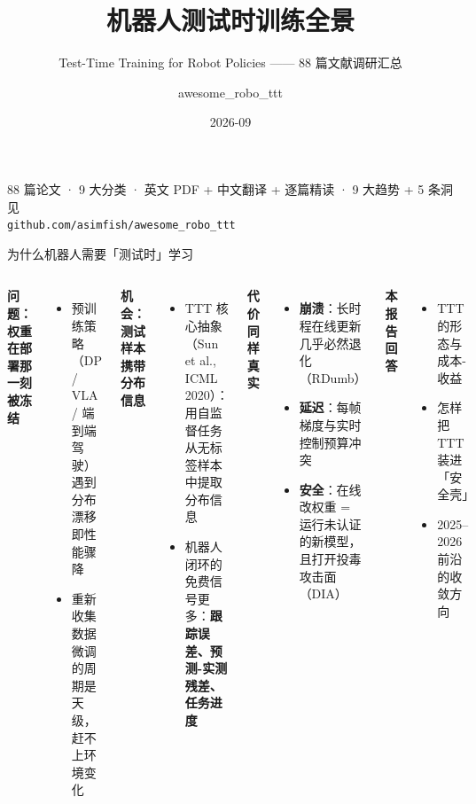\documentclass[10pt,aspectratio=169]{beamer}
\title[awesome\_robo\_ttt]{机器人测试时训练全景}
\subtitle{Test-Time Training for Robot Policies —— 88 篇文献调研汇总}
\author{awesome\_robo\_ttt}
\date{2026-09}
\newcommand{\hl}[1]{\textcolor{good}{\textbf{#1}}}
\newcommand{\ba}[1]{\textcolor{bad}{\textbf{#1}}}
\begin{document}
\begin{frame}
\titlepage
\begin{center}
\small 88 篇论文 · 9 大分类 · 英文 PDF + 中文翻译 + 逐篇精读 · 9 大趋势 + 5 条洞见\\
\texttt{github.com/asimfish/awesome\_robo\_ttt}
\end{center}
\end{frame}

\begin{frame}{为什么机器人需要「测试时」学习}
\begin{columns}[T]
\textbf{问题：权重在部署那一刻被冻结}
\begin{itemize}
\item 预训练策略（DP / VLA / 端到端驾驶）遇到分布漂移即性能骤降
\item 重新收集数据微调的周期是天级，赶不上环境变化
\end{itemize}
\vspace{4pt}
\textbf{机会：测试样本携带分布信息}
\begin{itemize}
\item TTT 核心抽象（Sun et al., ICML 2020）：用自监督任务从无标签样本中提取分布信息
\item 机器人闭环的免费信号更多：\hl{跟踪误差、预测-实测残差、任务进度}
\end{itemize}
\textbf{代价同样真实}
\begin{itemize}
\item \ba{崩溃}：长时程在线更新几乎必然退化（RDumb）
\item \ba{延迟}：每帧梯度与实时控制预算冲突
\item \ba{安全}：在线改权重 = 运行未认证的新模型，且打开投毒攻击面（DIA）
\end{itemize}
\vspace{4pt}
\textbf{本报告回答}
\begin{itemize}
\item TTT 的形态与成本-收益
\item 怎样把 TTT 装进「安全壳」
\item 2025--2026 前沿的收敛方向
\end{itemize}
\end{columns}
\end{frame}
\end{document}
